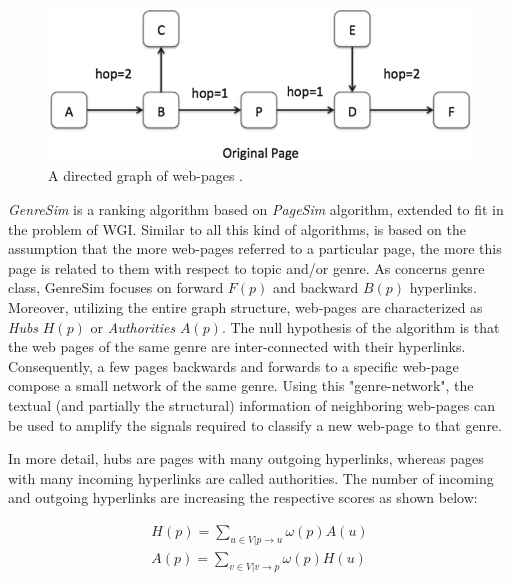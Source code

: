 \begin{figure}[t]
	\begin{center}
    	\includegraphics[scale=0.95]{Figures/GenreSim_Draw.eps}
		\caption{A directed graph of web-pages \parencite{zhu2016exploiting}.}\label{fig:GenreSim_Draw}
	\end{center}
\end{figure}

\textit{GenreSim} is a ranking algorithm based on \textit{PageSim} algorithm, extended to fit in the problem of WGI. Similar to all this kind of algorithms, is based on the assumption that the more web-pages referred to a particular page, the more this page is related to them with respect to topic and/or genre. As concerns genre class, GenreSim focuses on forward $F(p)$ and backward $B(p)$ hyperlinks. Moreover, utilizing the entire graph structure, web-pages are characterized as \textit{Hubs} $H(p)$ or \textit{Authorities} $A(p)$. The null hypothesis of the algorithm is that the web pages of the same genre are inter-connected with their hyperlinks. Consequently, a few pages backwards and forwards to a specific web-page compose a small network of the same genre. Using this "genre-network", the textual (and partially the structural) information of neighboring web-pages can be used to amplify the signals required to classify a new web-page to that genre.

In more detail, hubs are pages with many outgoing hyperlinks, whereas pages with many incoming hyperlinks are called authorities. The number of incoming and outgoing hyperlinks are increasing the respective scores as shown below: 

\begin{equation}\label{eq:GenreSim_hub_authortities}
	\begin{array}{l}
		H(p) = \sum_{u \in V|p \to u} \omega(p) A(u) \\  
    	A(p) = \sum_{v \in V|v \to p} \omega(p) H(u) \\
    \end{array}
\end{equation}

